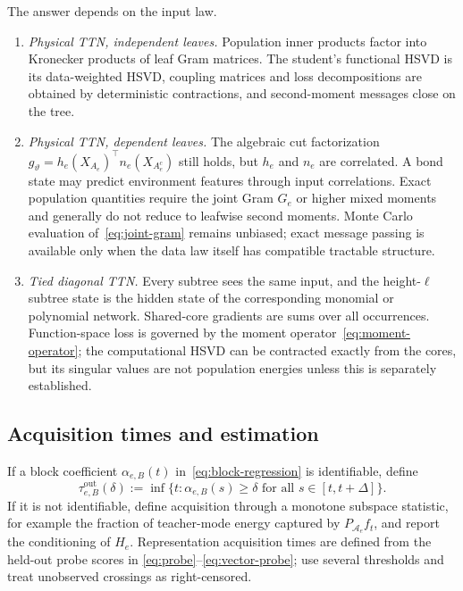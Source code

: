 The answer depends on the input law.
\begin{enumerate}[label=(\roman*),nosep]
\item \emph{Physical TTN, independent leaves.}  Population inner products factor into Kronecker
      products of leaf Gram matrices.  The student's functional HSVD is its data-weighted HSVD,
      coupling matrices and loss decompositions are obtained by deterministic contractions, and
      second-moment messages close on the tree.
\item \emph{Physical TTN, dependent leaves.}  The algebraic cut factorization
      $g_\vartheta=h_e(X_{A_e})^\top n_e(X_{A_e^c})$ still holds, but $h_e$ and $n_e$ are correlated.
      A bond state may predict environment features through input correlations.  Exact population
      quantities require the joint Gram $G_e$ or higher mixed moments and generally do not reduce
      to leafwise second moments.  Monte Carlo evaluation of~\eqref{eq:joint-gram} remains unbiased;
      exact message passing is available only when the data law itself has compatible tractable
      structure.
\item \emph{Tied diagonal TTN.}  Every subtree sees the same input, and the height-$\ell$ subtree
      state is the hidden state of the corresponding monomial or polynomial network.  Shared-core
      gradients are sums over all occurrences.  Function-space loss is governed by the moment
      operator~\eqref{eq:moment-operator}; the computational HSVD can be contracted exactly from
      the cores, but its singular values are not population energies unless this is separately
      established.
\end{enumerate}

\subsection{Acquisition times and estimation}\label{sec:compare-protocol}

If a block coefficient $\alpha_{e,B}(t)$ in~\eqref{eq:block-regression} is identifiable, define
\begin{equation}\label{eq:acq-times}
 \tau^{\mathrm{out}}_{e,B}(\delta)
 :=\inf\{t:\alpha_{e,B}(s)\ge\delta\text{ for all }s\in[t,t+\Delta]\}.
\end{equation}
If it is not identifiable, define acquisition through a monotone subspace statistic, for example the
fraction of teacher-mode energy captured by $P_{\mathcal A_e}f_t$, and report the conditioning of
$H_e$.  Representation acquisition times are defined from the held-out probe scores in
\eqref{eq:probe}--\eqref{eq:vector-probe}; use several thresholds and treat unobserved crossings as
right-censored.

